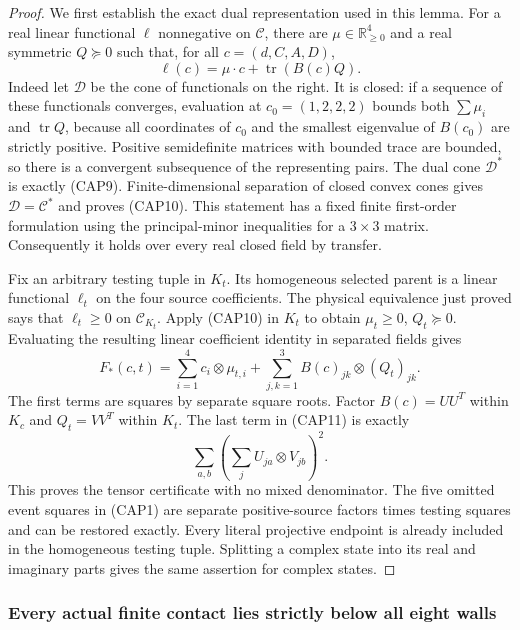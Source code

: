 \begin{proof}
We first establish the exact dual representation used in this lemma.
For a real linear functional $\ell$ nonnegative on $\mathcal C$,
there are $\mu\in\mathbb R_{\geq0}^4$ and a real symmetric
$Q\succeq0$ such that, for all $c=(d,C,A,D)$,
\[
\ell(c)=\mu\cdot c+\operatorname{tr}(B(c)Q).
\tag{CAP10}
\]
Indeed let $\mathcal D$ be the cone of functionals on the right.  It
is closed: if a sequence of these functionals converges, evaluation
at $c_0=(1,2,2,2)$ bounds both $\sum\mu_i$ and
$\operatorname{tr}Q$, because all coordinates of $c_0$ and the
smallest eigenvalue of $B(c_0)$ are strictly positive.  Positive
semidefinite matrices with bounded trace are bounded, so there is a
convergent subsequence of the representing pairs.  The dual cone
$\mathcal D^*$ is exactly (CAP9).  Finite-dimensional separation of
closed convex cones gives $\mathcal D=\mathcal C^*$ and proves
(CAP10).  This statement has a fixed finite first-order formulation
using the principal-minor inequalities for a $3\times3$ matrix.
Consequently it holds over every real closed field by transfer.

Fix an arbitrary testing tuple in $K_t$.  Its homogeneous selected
parent is a linear functional $\ell_t$ on the four source
coefficients.  The physical equivalence just proved says that
$\ell_t\geq0$ on $\mathcal C_{K_t}$.  Apply (CAP10) in $K_t$ to
obtain $\mu_t\geq0$, $Q_t\succeq0$.  Evaluating the resulting
linear coefficient identity in separated fields gives
\[
F_*(c,t)=\sum_{i=1}^4c_i\otimes\mu_{t,i}
 +\sum_{j,k=1}^3 B(c)_{jk}\otimes(Q_t)_{jk}.
\tag{CAP11}
\]
The first terms are squares by separate square roots.  Factor
$B(c)=UU^T$ within $K_c$ and $Q_t=VV^T$ within $K_t$.  The last
term in (CAP11) is exactly
\[
\sum_{a,b}\left(\sum_jU_{ja}\otimes V_{jb}\right)^2.
\]
This proves the tensor certificate with no mixed denominator.  The
five omitted event squares in (CAP1) are separate positive-source
factors times testing squares and can be restored exactly.  Every
literal projective endpoint is already included in the homogeneous
testing tuple.  Splitting a complex state into its real and imaginary
parts gives the same assertion for complex states.
\end{proof}

\subsubsection*{Every actual finite contact lies strictly below all eight walls}

